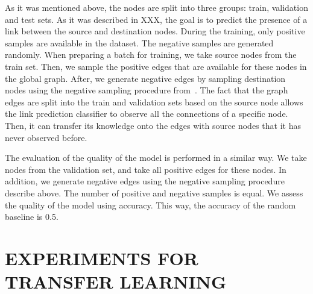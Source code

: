\documentclass[a4paper,twoside]{article}
\begin{document}
As it was mentioned above, the nodes are split into three groups: train, validation and test sets. As it was described in XXX, the goal is to predict the presence of a link between the source and destination nodes. During the training, only positive samples are available in the dataset. The negative samples are generated randomly. When preparing a batch for training, we take source nodes from the train set. Then, we sample the positive edges that are available for these nodes in the global graph. After, we generate negative edges by sampling destination nodes using the negative sampling procedure from~\cite{mikolov2013distributed}. The fact that the graph edges are split into the train and validation sets based on the source node allows the link prediction classifier to observe all the connections of a specific node. Then, it can transfer its knowledge onto the edges with source nodes that it has never observed before.

The evaluation of the quality of the model is performed in a similar way. We take nodes from the validation set, and take all positive edges for these nodes. In addition, we generate negative edges using the negative sampling procedure describe above. The number of positive and negative samples is equal. We assess the quality of the model using accuracy. This way, the accuracy of the random baseline is 0.5.

\section{\uppercase{Experiments for Transfer Learning}}
\end{document}

